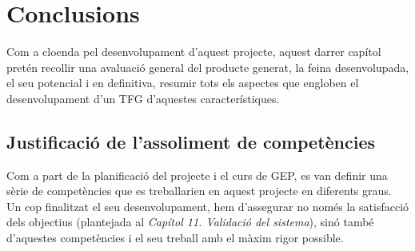 
\chapter{Conclusions} %

\label{Conclusions} %

Com a cloenda pel desenvolupament d'aquest projecte, aquest darrer capítol pretén recollir una avaluació general del producte generat, la feina desenvolupada, el seu potencial i en definitiva, resumir tots els aspectes que engloben el desenvolupament d'un TFG d'aquestes característiques.

\section{Justificació de l'assoliment de competències}

Com a part de la planificació del projecte i el curs de GEP, es van definir una sèrie de competències que es treballarien en aquest projecte en diferents graus. Un cop finalitzat el seu desenvolupament, hem d'assegurar no només la satisfacció dels objectius (plantejada al \textit{Capítol 11. Validació del sistema}), sinó també d'aquestes competències i el seu treball amb el màxim rigor possible.

